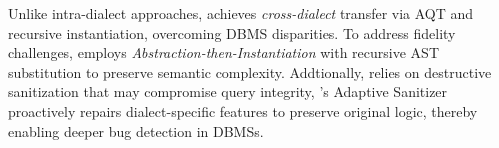 \documentclass[sigconf,review,anonymous]{acmart}
\begin{document}
Unlike intra-dialect approaches, \tool{} achieves \textit{cross-dialect} transfer via AQT and recursive instantiation, overcoming DBMS disparities. To address fidelity challenges, \tool{} employs \textit{Abstraction-then-Instantiation} with recursive AST substitution to preserve semantic complexity. Addtionally, \sedar{} relies on destructive sanitization that may compromise query integrity, \tool{}'s Adaptive Sanitizer proactively repairs dialect-specific features to preserve original logic, thereby enabling deeper bug detection in DBMSs.





\end{document}
